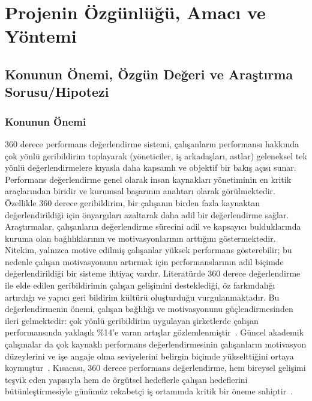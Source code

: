\documentclass[a4paper,12pt]{article}
\begin{document}
\newpage
\section*{Projenin Özgünlüğü, Amacı ve Yöntemi}
\subsection*{Konunun Önemi, Özgün Değeri ve Araştırma Sorusu/Hipotezi}
\noindent 
\subsubsection*{Konunun Önemi}
360 derece performans değerlendirme sistemi, çalışanların performansı hakkında çok yönlü geribildirim toplayarak (yöneticiler, iş arkadaşları, astlar) geleneksel tek yönlü
değerlendirmelere kıyasla daha kapsamlı ve objektif bir bakış açısı sunar. Performans
değerlendirme genel olarak insan kaynakları yönetiminin en kritik araçlarından biridir ve kurumsal
başarının anahtarı olarak görülmektedir. Özellikle 360 derece geribildirim, bir çalışanın birden fazla
kaynaktan değerlendirildiği için önyargıları azaltarak daha adil bir değerlendirme sağlar.
Araştırmalar, çalışanların değerlendirme sürecini adil ve kapsayıcı bulduklarında kuruma olan
bağlılıklarının ve motivasyonlarının arttığını göstermektedir. Nitekim, yalnızca motive edilmiş
çalışanlar yüksek performans gösterebilir; bu nedenle çalışan motivasyonunu artırmak için
performanslarının adil biçimde değerlendirildiği bir sisteme ihtiyaç vardır. Literatürde 360 derece
değerlendirme ile elde edilen geribildirimin çalışan gelişimini desteklediği, öz farkındalığı artırdığı ve
yapıcı geri bildirim kültürü oluşturduğu vurgulanmaktadır. Bu değerlendirmenin önemi, çalışan
bağlılığı ve motivasyonunu güçlendirmesinden ileri gelmektedir: çok yönlü geribildirim uygulayan
şirketlerde çalışan performansında yaklaşık \%14’e varan artışlar gözlemlenmiştir~\cite{datalligence2025_guide}. Güncel akademik çalışmalar da çok
kaynaklı performans değerlendirmesinin çalışanların motivasyon düzeylerini ve işe angaje olma
seviyelerini belirgin biçimde yükselttiğini ortaya koymuştur~\cite{bapar2024_360}. Kısacası, 360 derece performans
değerlendirme, hem bireysel gelişimi teşvik eden yapısıyla hem de örgütsel hedeflerle çalışan
hedeflerini bütünleştirmesiyle günümüz rekabetçi iş ortamında kritik bir öneme sahiptir~\cite{uygur2015_360tr}. 
\end{document}
